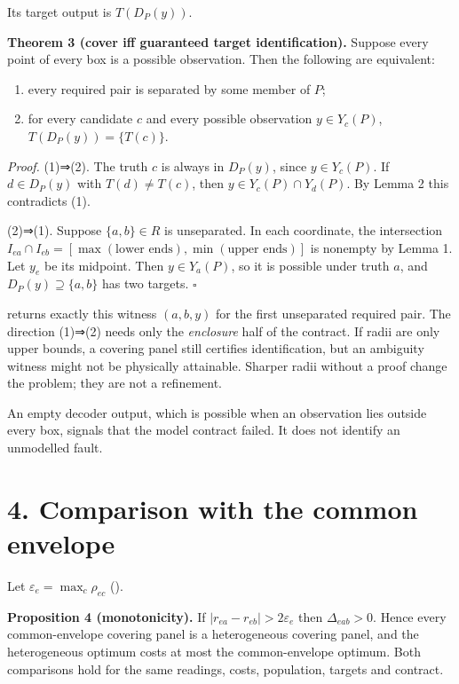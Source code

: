 \documentclass[
  11pt,
  a4paper,
]{report}
\providecommand{\tightlist}{%
  \setlength{\itemsep}{0pt}\setlength{\parskip}{0pt}}
\let\singularitytexttt\texttt
\renewcommand{\texttt}[1]{\singularitytexttt{\seqsplit{#1}}}
\begin{document}
Its target output is \(T(D_P(y))\).

\textbf{Theorem 3 (cover iff guaranteed target identification).} Suppose
every point of every box is a possible observation. Then the following
are equivalent:

\begin{enumerate}
\def\labelenumi{\arabic{enumi}.}
\tightlist
\item
  every required pair is separated by some member of \(P\);
\item
  for every candidate \(c\) and every possible observation
  \(y\in Y_c(P)\), \(T(D_P(y))=\{T(c)\}\).
\end{enumerate}

\emph{Proof.} (1)⇒(2). The truth \(c\) is always in \(D_P(y)\), since
\(y\in Y_c(P)\). If \(d\in D_P(y)\) with \(T(d)\ne T(c)\), then
\(y\in Y_c(P)\cap Y_d(P)\). By Lemma 2 this contradicts (1).

(2)⇒(1). Suppose \(\{a,b\}\in R\) is unseparated. In each coordinate,
the intersection
\(I_{ea}\cap I_{eb}=[\max(\text{lower ends}),\min(\text{upper ends})]\)
is nonempty by Lemma 1. Let \(y_e\) be its midpoint. Then
\(y\in Y_a(P)\), so it is possible under truth \(a\), and
\(D_P(y)\supseteq\{a,b\}\) has two targets. \(\square\)

\texttt{candidate\_box\_ambiguity} returns exactly this witness
\((a,b,y)\) for the first unseparated required pair. The direction
(1)⇒(2) needs only the \emph{enclosure} half of the contract. If radii
are only upper bounds, a covering panel still certifies identification,
but an ambiguity witness might not be physically attainable. Sharper
radii without a proof change the problem; they are not a refinement.

An empty decoder output, which is possible when an observation lies
outside every box, signals that the model contract failed. It does not
identify an unmodelled fault.

\hypertarget{comparison-with-the-common-envelope}{%
\section{4. Comparison with the common
envelope}\label{comparison-with-the-common-envelope}}

Let \(\varepsilon_e=\max_c\rho_{ec}\) (\texttt{common\_envelope}).

\textbf{Proposition 4 (monotonicity).} If
\(|r_{ea}-r_{eb}|>2\varepsilon_e\) then \(\Delta_{eab}>0\). Hence every
common-envelope covering panel is a heterogeneous covering panel, and
the heterogeneous optimum costs at most the common-envelope optimum.
Both comparisons hold for the same readings, costs, population, targets
and contract.
\end{document}
